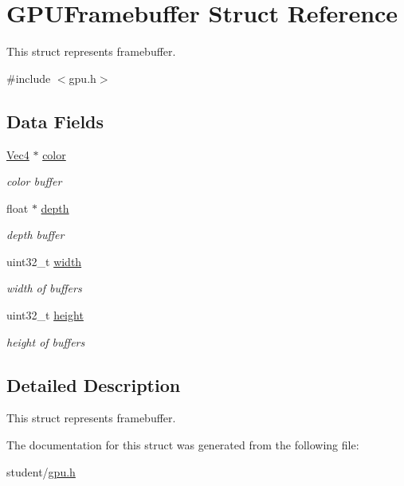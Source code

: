 \hypertarget{structGPUFramebuffer}{}\section{G\+P\+U\+Framebuffer Struct Reference}
\label{structGPUFramebuffer}


This struct represents framebuffer.  




{\ttfamily \#include $<$gpu.\+h$>$}

\subsection*{Data Fields}
\begin{DoxyCompactItemize}
\item 
\mbox{\label{structGPUFramebuffer_abcb6c852e61831c6f4ac4f2f082bf151}} 
\hyperlink{structVec4}{Vec4} $\ast$ \hyperlink{structGPUFramebuffer_abcb6c852e61831c6f4ac4f2f082bf151}{color}
\begin{DoxyCompactList}\small\item\em color buffer \end{DoxyCompactList}\item 
\mbox{\label{structGPUFramebuffer_a500507b2a8767553fbf9fefd959f229d}} 
float $\ast$ \hyperlink{structGPUFramebuffer_a500507b2a8767553fbf9fefd959f229d}{depth}
\begin{DoxyCompactList}\small\item\em depth buffer \end{DoxyCompactList}\item 
\mbox{\label{structGPUFramebuffer_a6475f75a6d81ac7136b48878ee715e77}} 
uint32\+\_\+t \hyperlink{structGPUFramebuffer_a6475f75a6d81ac7136b48878ee715e77}{width}
\begin{DoxyCompactList}\small\item\em width of buffers \end{DoxyCompactList}\item 
\mbox{\label{structGPUFramebuffer_aa29fad24a06f87d8406b5b2ccc9413ad}} 
uint32\+\_\+t \hyperlink{structGPUFramebuffer_aa29fad24a06f87d8406b5b2ccc9413ad}{height}
\begin{DoxyCompactList}\small\item\em height of buffers \end{DoxyCompactList}\end{DoxyCompactItemize}


\subsection{Detailed Description}
This struct represents framebuffer. 

The documentation for this struct was generated from the following file\+:\begin{DoxyCompactItemize}
\item 
student/\hyperlink{gpu_8h}{gpu.\+h}\end{DoxyCompactItemize}
